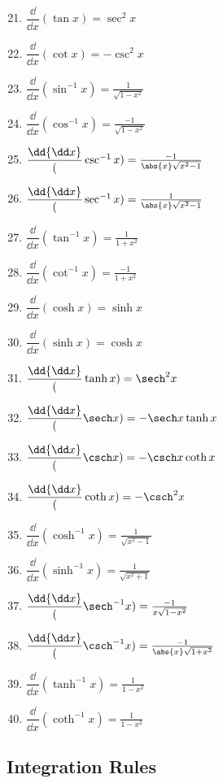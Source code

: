 \parbox{.22\linewidth}{%
\begin{enumerate}\setcounter{enumi}{20}
\item $\dfrac\dd{\dd x}(\tan x)=\sec^2x$
\item $\dfrac\dd{\dd x}(\cot x)=-\csc^2x$
\item $\dfrac\dd{\dd x}(\sin^{-1}x)=\frac1{\sqrt{1-x^2}}$
\item $\dfrac\dd{\dd x}(\cos^{-1}x)=\frac{-1}{\sqrt{1-x^2}}$
\item $\dfrac\dd{\dd x}(\csc^{-1}x)=\frac{-1}{\abs{x}\sqrt{x^2-1}}$
\item $\dfrac\dd{\dd x}(\sec^{-1}x)=\frac1{\abs{x}\sqrt{x^2-1}}$%
\item $\dfrac\dd{\dd x}(\tan^{-1}x)=\frac1{1+x^2}$
\item $\dfrac\dd{\dd x}(\cot^{-1}x)=\frac{-1}{1+x^2}$
\item $\dfrac\dd{\dd x}(\cosh x)=\sinh x$
\item $\dfrac\dd{\dd x}(\sinh x)=\cosh x$
\end{enumerate}}\hfill
\parbox{.24\linewidth}{%
\begin{enumerate}\setcounter{enumi}{30}
\item $\dfrac\dd{\dd x}(\tanh x)=\sech^2x$
\item $\dfrac\dd{\dd x}(\sech x)=-\sech x\tanh x$
\item $\dfrac\dd{\dd x}(\csch x)=-\csch x\coth x$
\item $\dfrac\dd{\dd x}(\coth x)=-\csch^2 x$
\item $\dfrac\dd{\dd x}(\cosh^{-1}x)=\frac1{\sqrt{x^2-1}}$
\item $\dfrac\dd{\dd x}(\sinh^{-1}x)=\frac1{\sqrt{x^2+1}}$
\item $\dfrac\dd{\dd x}(\sech^{-1}x)=\frac{-1}{x\sqrt{1-x^2}}$
\item $\dfrac\dd{\dd x}(\csch^{-1}x)=\frac{-1}{\abs{x}\sqrt{1+x^2}}$
\item $\dfrac\dd{\dd x}(\tanh^{-1}x)=\frac1{1-x^2}$
\item $\dfrac\dd{\dd x}(\coth^{-1}x)=\frac1{1-x^2}$
\end{enumerate}}

\vfill

\subsection{Integration Rules}

